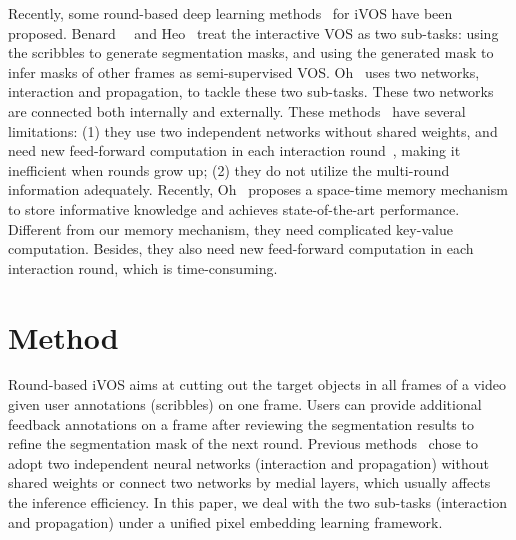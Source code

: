 \documentclass[10pt,twocolumn,letterpaper]{article}
\begin{document}
Recently, some round-based deep learning methods~\cite{oh2019fast,DAVIS2019-Interactive-2nd,DAVIS2018-Interactive-2nd,benard2017interactive} for iVOS have been proposed. Benard~\etal~\cite{benard2017interactive} and Heo~\cite{DAVIS2019-Interactive-2nd} treat the interactive VOS as two sub-tasks: using the scribbles to generate segmentation masks, and using the generated mask to infer masks of other frames as semi-supervised VOS. Oh~\cite{oh2019fast} uses two networks, interaction and propagation, to tackle these two sub-tasks. These two networks are connected both internally and externally. These methods~\cite{benard2017interactive,DAVIS2019-Interactive-2nd,oh2019fast} have several limitations: (1) they use two independent networks without shared weights, and need new feed-forward computation in each interaction round~\cite{oh2019fast,DAVIS2019-Interactive-2nd}, making it inefficient when rounds grow up; (2) they do not utilize the multi-round information adequately. Recently, Oh~\cite{oh2019video} proposes a space-time memory mechanism to store informative knowledge and achieves state-of-the-art performance. Different from our memory mechanism, they need complicated key-value computation. Besides, they also need new feed-forward computation in each interaction round, which is time-consuming.
 
\section{Method}
Round-based iVOS aims at cutting out the target objects in all frames of a video given user annotations (\eg scribbles) on one frame. Users can provide additional feedback annotations on a frame after reviewing the segmentation results to refine the segmentation mask of the next round.   Previous methods~\cite{DAVIS2019-Interactive-2nd,oh2019fast,benard2017interactive} chose to adopt two independent neural networks (interaction and propagation) without shared weights or connect two networks by medial layers, which usually affects the inference efficiency. In this paper, we deal with the two sub-tasks (interaction and propagation) under a unified pixel embedding learning framework. 
\end{document}
